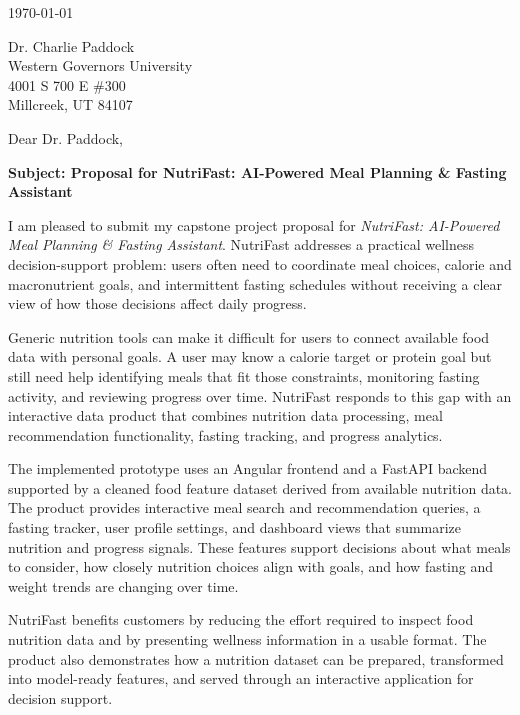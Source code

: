 \documentclass[12pt]{report}
\begin{document}
\today

\vspace{0.5cm}

Dr. Charlie Paddock\\
Western Governors University\\
4001 S 700 E \#300\\
Millcreek, UT 84107\\

\vspace{0.75cm}

Dear Dr. Paddock,

\vspace{0.25cm}

\textbf{Subject: Proposal for NutriFast: AI-Powered Meal Planning \& Fasting Assistant}

\vspace{0.25cm}

I am pleased to submit my capstone project proposal for \textit{NutriFast: AI-Powered Meal Planning \& Fasting Assistant}. NutriFast addresses a practical wellness decision-support problem: users often need to coordinate meal choices, calorie and macronutrient goals, and intermittent fasting schedules without receiving a clear view of how those decisions affect daily progress.

Generic nutrition tools can make it difficult for users to connect available food data with personal goals. A user may know a calorie target or protein goal but still need help identifying meals that fit those constraints, monitoring fasting activity, and reviewing progress over time. NutriFast responds to this gap with an interactive data product that combines nutrition data processing, meal recommendation functionality, fasting tracking, and progress analytics.

The implemented prototype uses an Angular frontend and a FastAPI backend supported by a cleaned food feature dataset derived from available nutrition data. The product provides interactive meal search and recommendation queries, a fasting tracker, user profile settings, and dashboard views that summarize nutrition and progress signals. These features support decisions about what meals to consider, how closely nutrition choices align with goals, and how fasting and weight trends are changing over time.

NutriFast benefits customers by reducing the effort required to inspect food nutrition data and by presenting wellness information in a usable format. The product also demonstrates how a nutrition dataset can be prepared, transformed into model-ready features, and served through an interactive application for decision support.
\end{document}
